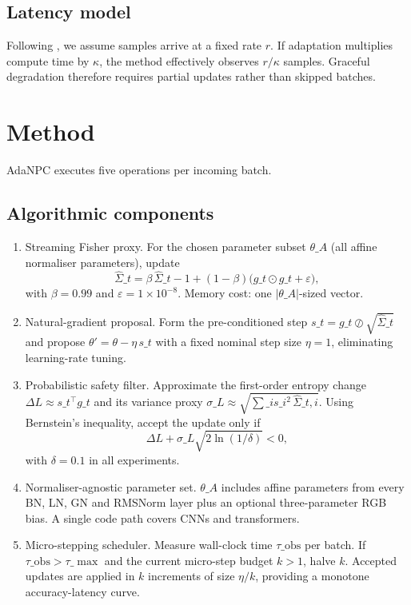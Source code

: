 \documentclass{article} %
\begin{document}
\subsection{Latency model}
Following \cite{alfarra-2023-evaluation}, we assume samples arrive at a fixed rate \(r\). If adaptation multiplies compute time by \(\kappa\), the method effectively observes \(r/\kappa\) samples. Graceful degradation therefore requires partial updates rather than skipped batches.

\section{Method}
\label{sec:method}
AdaNPC executes five operations per incoming batch.
\subsection{Algorithmic components}
\begin{enumerate}
  \item Streaming Fisher proxy. For the chosen parameter subset \(\theta\_A\) (all affine normaliser parameters), update
  \[
    \hat{\Sigma}\_t = \beta \, \hat{\Sigma}\_{t-1} + (1-\beta)\big( g\_t \odot g\_t + \varepsilon \big),
  \]
  with \(\beta = 0.99\) and \(\varepsilon = 1\times 10^{-8}\). Memory cost: one \(\lvert\theta\_A\rvert\)-sized vector.
  \item Natural-gradient proposal. Form the pre-conditioned step \(s\_t = g\_t \oslash \sqrt{\hat{\Sigma}\_t}\) and propose \(\theta' = \theta - \eta \, s\_t\) with a fixed nominal step size \(\eta = 1\), eliminating learning-rate tuning.
  \item Probabilistic safety filter. Approximate the first-order entropy change \(\Delta L \approx s\_t^{\top} g\_t\) and its variance proxy \(\sigma\_L \approx \sqrt{\sum\_i s\_i^2 \, \hat{\Sigma}\_{t,i}}\). Using Bernstein's inequality, accept the update only if
  \[
    \Delta L + \sigma\_L \sqrt{2\ln(1/\delta)} < 0,
  \]
  with \(\delta = 0.1\) in all experiments.
  \item Normaliser-agnostic parameter set. \(\theta\_A\) includes affine parameters from every BN, LN, GN and RMSNorm layer plus an optional three-parameter RGB bias. A single code path covers CNNs and transformers.
  \item Micro-stepping scheduler. Measure wall-clock time \(\tau\_{\mathrm{obs}}\) per batch. If \(\tau\_{\mathrm{obs}} > \tau\_{\max}\) and the current micro-step budget \(k>1\), halve \(k\). Accepted updates are applied in \(k\) increments of size \(\eta/k\), providing a monotone accuracy-latency curve.
\end{enumerate}
\end{document}
